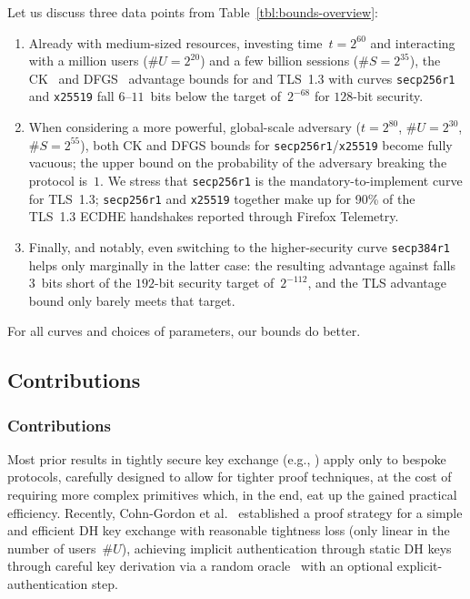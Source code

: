 Let us discuss three data points from Table~\ref{tbl:bounds-overview}:
\begin{enumerate}
	\item Already with medium-sized resources, investing time~$t = 2^{60}$ and interacting with a million users ($\#U = 2^{20}$) and a few billion sessions ($\#S = 2^{35}$), the CK~\cite{C:CanKra02} and DFGS~\cite{JC:DFGS21} advantage bounds for \SIGMA and TLS~1.3 with curves \texttt{secp256r1} and \texttt{x25519} fall $6$--$11$~bits below the target of~$2^{-68}$ for $128$-bit security.
	
	\item When considering a more powerful, global-scale adversary ($t = 2^{80}$, $\#U = 2^{30}$, $\#S = 2^{55}$), both CK and DFGS bounds for \texttt{secp256r1}/\texttt{x25519} become fully vacuous;
	the upper bound on the probability of the adversary breaking the protocol is~$1$.
	We stress that \texttt{secp256r1} is the mandatory-to-implement curve for TLS~1.3;
	\texttt{secp256r1} and \texttt{x25519} together make up for 90\% of the TLS~1.3 ECDHE handshakes reported through Firefox Telemetry.

	\item Finally, and notably, even switching to the higher-security curve \texttt{secp384r1} helps only marginally in the latter case:
	the resulting advantage against \SIGMA falls $3$~bits short of the $192$-bit security target of~$2^{-112}$,
	and the TLS advantage bound only barely meets that target.
\end{enumerate}
For all curves and choices of parameters, our bounds do better. 


\iffull
\subsection{Contributions}
\else
\subsubsection*{Contributions\lncsdot}
\fi

Most prior results in tightly secure key exchange (e.g., \cite{TCC:BHJKL15,C:GjoJag18}) apply only to bespoke protocols, carefully designed to allow for tighter proof techniques, at the cost of requiring more complex primitives which, in the end, eat up the gained practical efficiency.
\iffull
Recently, Cohn-Gordon et al.~\cite{C:CCGJJ19,EPRINT:CCGJJ19} established a proof strategy for a simple and efficient DH key exchange with reasonable tightness loss (only linear in the number of users~$\#U$), achieving implicit authentication through static DH keys through careful key derivation via a random oracle~\cite{CCS:BelRog93} with an optional explicit-authentication step.


